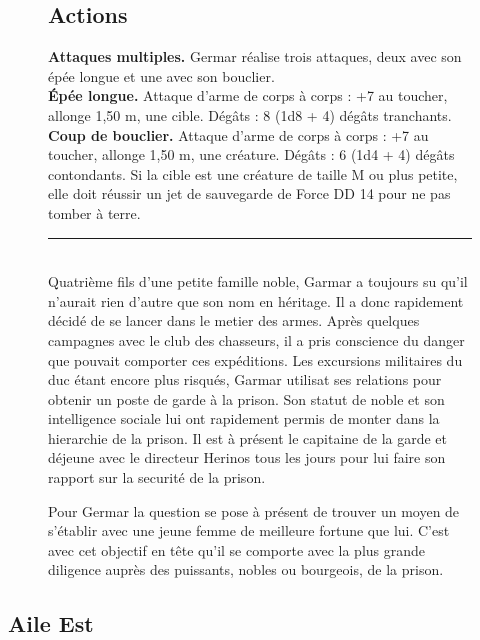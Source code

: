 \begin{figure}[btp]
{\begin{minipage}[c]{\linewidth}
    \subsection*{Actions}
    {\bfseries Attaques multiples.} Germar réalise trois attaques, deux avec son épée longue et une
               avec son bouclier.\\
    {\bfseries Épée longue.} Attaque d'arme de corps à corps : +7 au toucher, allonge 1,50 m, 
               une cible. Dégâts : 8 (1d8 + 4) dégâts tranchants. \\
    {\bfseries Coup de bouclier.} Attaque d'arme de corps à corps : +7 au toucher, allonge 1,50 m, 
               une créature. Dégâts : 6 (1d4 + 4) dégâts contondants. Si la cible est une créature de 
               taille M ou plus petite, elle doit réussir un jet de sauvegarde de Force DD 14 pour ne 
               pas tomber à terre.\\
    \noindent\rule{\textwidth}{1pt} \\
Quatrième fils d'une petite famille noble, Garmar a toujours su qu'il n'aurait 
rien d'autre que son nom en héritage. Il a donc rapidement décidé de se lancer 
dans le metier des armes. Après quelques
campagnes avec le club des chasseurs, il a pris conscience du danger que pouvait 
comporter ces expéditions. Les excursions militaires du duc étant encore plus
risqués, Garmar utilisat ses relations pour obtenir un poste de garde à la prison.
Son statut de noble et son intelligence sociale lui ont rapidement permis de 
monter dans la hierarchie de la prison. Il est à présent le capitaine de la
garde et déjeune avec le directeur Herinos tous les jours pour lui faire son
rapport sur la securité de la prison.

Pour Germar la question se pose à présent de trouver un moyen de s'établir
avec une jeune femme de meilleure fortune que lui.
C'est avec cet objectif en tête qu'il se comporte avec la plus grande 
diligence auprès des puissants, nobles ou bourgeois, de la prison.
 \end{minipage}
}%
\end{figure}


\subsection{Aile Est}

